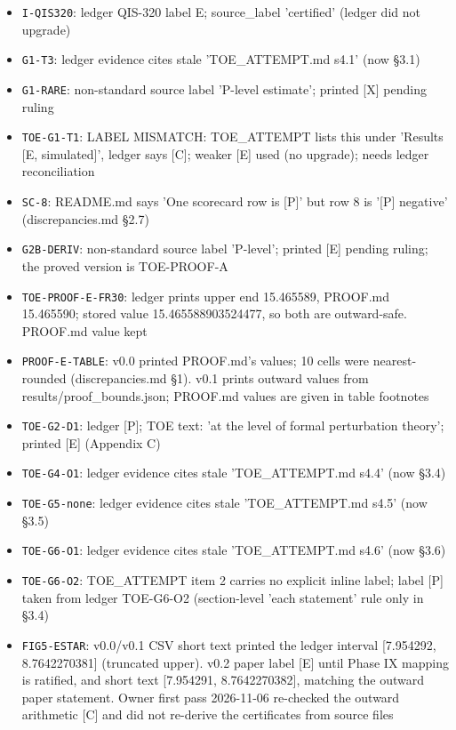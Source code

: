 \begin{itemize}\small
\item \texttt{I-QIS320}: ledger QIS-320 label E; source\_label 'certified' (ledger did not upgrade)
\item \texttt{G1-T3}: ledger evidence cites stale 'TOE\_ATTEMPT.md s4.1' (now \S{}3.1)
\item \texttt{G1-RARE}: non-standard source label 'P-level estimate'; printed [X] pending ruling
\item \texttt{TOE-G1-T1}: LABEL MISMATCH: TOE\_ATTEMPT lists this under 'Results [E, simulated]', ledger says [C]; weaker [E] used (no upgrade); needs ledger reconciliation
\item \texttt{SC-8}: README.md says 'One scorecard row is [P]' but row 8 is '[P] negative' (discrepancies.md \S{}2.7)
\item \texttt{G2B-DERIV}: non-standard source label 'P-level'; printed [E] pending ruling; the proved version is TOE-PROOF-A
\item \texttt{TOE-PROOF-E-FR30}: ledger prints upper end 15.465589, PROOF.md 15.465590; stored value 15.465588903524477, so both are outward-safe. PROOF.md value kept
\item \texttt{PROOF-E-TABLE}: v0.0 printed PROOF.md's values; 10 cells were nearest-rounded (discrepancies.md \S{}1). v0.1 prints outward values from results/proof\_bounds.json; PROOF.md values are given in table footnotes
\item \texttt{TOE-G2-D1}: ledger [P]; TOE text: 'at the level of formal perturbation theory'; printed [E] (Appendix C)
\item \texttt{TOE-G4-O1}: ledger evidence cites stale 'TOE\_ATTEMPT.md s4.4' (now \S{}3.4)
\item \texttt{TOE-G5-none}: ledger evidence cites stale 'TOE\_ATTEMPT.md s4.5' (now \S{}3.5)
\item \texttt{TOE-G6-O1}: ledger evidence cites stale 'TOE\_ATTEMPT.md s4.6' (now \S{}3.6)
\item \texttt{TOE-G6-O2}: TOE\_ATTEMPT item 2 carries no explicit inline label; label [P] taken from ledger TOE-G6-O2 (section-level 'each statement' rule only in \S{}3.4)
\item \texttt{FIG5-ESTAR}: v0.0/v0.1 CSV short text printed the ledger interval [7.954292, 8.7642270381] (truncated upper). v0.2 paper label [E] until Phase IX mapping is ratified, and short text [7.954291, 8.7642270382], matching the outward paper statement. Owner first pass 2026-11-06 re-checked the outward arithmetic [C] and did not re-derive the certificates from source files
\end{itemize}
